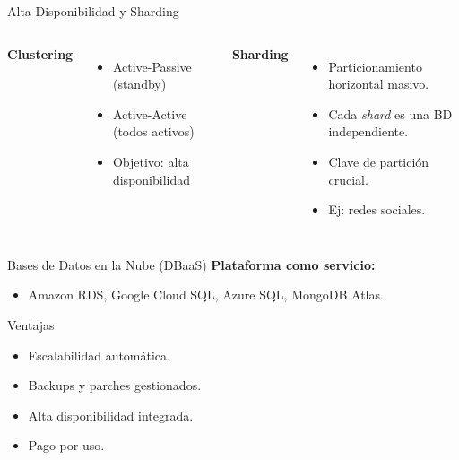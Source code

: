 \documentclass[aspectratio=169, 10pt, xcolor=table]{beamer}
\begin{document}
\begin{frame}{Alta Disponibilidad y Sharding}
    \begin{columns}[t]
        \textbf{Clustering}
        \begin{itemize}
            \item Active-Passive (standby)
            \item Active-Active (todos activos)
            \item Objetivo: alta disponibilidad
        \end{itemize}
        \textbf{Sharding}
        \begin{itemize}
            \item Particionamiento horizontal masivo.
            \item Cada \textit{shard} es una BD independiente.
            \item Clave de partición crucial.
            \item Ej: redes sociales.
        \end{itemize}
    \end{columns}
    \vspace{0.3cm}
    \centering
\end{frame}

\begin{frame}{Bases de Datos en la Nube (DBaaS)}
    \textbf{Plataforma como servicio:}
    \begin{itemize}
        \item Amazon RDS, Google Cloud SQL, Azure SQL, MongoDB Atlas.
    \end{itemize}
    \begin{block}{Ventajas}
        \begin{itemize}
            \item Escalabilidad automática.
            \item Backups y parches gestionados.
            \item Alta disponibilidad integrada.
            \item Pago por uso.
        \end{itemize}
    \end{block}
\end{frame}
\end{document}

